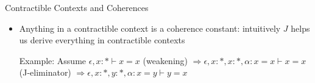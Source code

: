 \documentclass[12pt, mathserif,handout]{beamer}
\begin{document}
\begin{frame}[allowframebreaks,t]{Contractible Contexts and Coherences}
\begin{itemize}
\small{
\begin{code}\>\<%
\\
\>  \<%
\\
\>[0]\<[2]%
\>[2] \<[7]%
\>[7]\AgdaSymbol{:} \AgdaSymbol{\}\{} \AgdaSymbol{:}  \AgdaSymbol{\}}      \<%
\\
\>[0]\<[2]%
\>[2] \<[7]%
\>[7]\AgdaSymbol{:}  \AgdaSymbol{\}}     \AgdaSymbol{(} \AgdaSymbol{:}   \AgdaSymbol{)} \<[42]%
\>[42]\<%
\\
\>[2]\<[7]%
\>[7] \AgdaSymbol{(} \AgdaSymbol{:}  \AgdaSymbol{)}   \AgdaSymbol{(} \AgdaFunction{[}  \AgdaFunction{]T}\AgdaSymbol{)}\<%
\\
\>\<\end{code}
}

\item Anything in a contractible context is a coherence constant:
  intuitively $J$ helps us derive everything in contractible contexts

Example: Assume $\epsilon,x : * \vdash x = x$ (weakening)
$\Rightarrow \epsilon,x : *, x : *, \alpha : x = x \vdash x =
x$ (J-eliminator)
$\Rightarrow \epsilon,x : *, y : *, \alpha : x = y \vdash y = x$

\end{itemize}

\end{frame}
\end{document}

